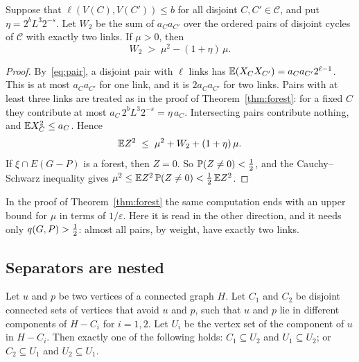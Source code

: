 \begin{lemma}\label{lem:twolinks}
Suppose that $\ell(V(C),V(C'))\le b$ for all disjoint $C,C'\in\mathcal C$, and put
$\eta=2^{b}L^{3}2^{-s}$. Let $W_2$ be the sum of $a_Ca_{C'}$ over the ordered pairs of disjoint
cycles of $\mathcal C$ with exactly two links. If $\mu>0$, then
\[
  W_2\;>\;\mu^{2}-(1+\eta)\,\mu .
\]
\end{lemma}

\begin{proof}
By~\eqref{eq:pair}, a disjoint pair with $\ell$ links has $\mathbb{E}(X_CX_{C'})=a_Ca_{C'}2^{\ell-1}$. This
is at most $a_Ca_{C'}$ for one link, and it is $2a_Ca_{C'}$ for two links. Pairs with at least three
links are treated as in the proof of Theorem~\ref{thm:forest}: for a fixed $C$ they contribute at
most $a_C\,2^{b}L^{3}2^{-s}=\eta\,a_C$. Intersecting pairs contribute nothing, and
$\mathbb{E} X_C^{2}\le a_C$. Hence
\[
  \mathbb{E} Z^{2}\;\le\;\mu^{2}+W_2+(1+\eta)\,\mu .
\]
If $\xi\cap E(G-P)$ is a forest, then $Z=0$. So $\mathbb{P}(Z\ne0)<\tfrac12$, and the Cauchy--Schwarz
inequality gives $\mu^{2}\le\mathbb{E} Z^{2}\,\mathbb{P}(Z\ne0)<\tfrac12\,\mathbb{E} Z^{2}$.
\end{proof}

In the proof of Theorem~\ref{thm:forest} the same computation ends with an upper bound for $\mu$
in terms of $1/\varepsilon$. Here it is read in the other direction, and it needs only
$q(G,P)>\tfrac12$: almost all pairs, by weight, have exactly two links.

\subsection{Separators are nested}

\begin{lemma}\label{lem:nested}
Let $u$ and $p$ be two vertices of a connected graph $H$. Let $C_1$ and $C_2$ be disjoint connected
sets of vertices that avoid $u$ and $p$, such that $u$ and $p$ lie in different components of
$H-C_i$ for $i=1,2$. Let $U_i$ be the vertex set of the component of $u$ in $H-C_i$. Then exactly
one of the following holds: $C_1\subseteq U_2$ and $U_1\subseteq U_2$; or $C_2\subseteq U_1$ and
$U_2\subseteq U_1$.
\end{lemma}

